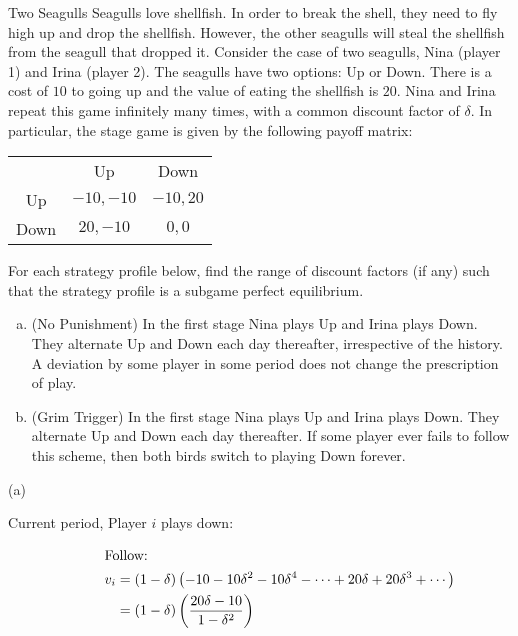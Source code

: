 \documentclass[8pt]{extarticle}
\begin{document}
  \begin{problem}{Two Seagulls}
    Seagulls love shellfish. In order to break the shell, they need to fly high up and drop the shellfish. However, the other seagulls will steal the shellfish from the seagull that dropped it. Consider the case of two seagulls, Nina (player 1) and Irina (player 2). The seagulls have two options: Up or Down. There is a cost of $10$ to going up and the value of eating the shellfish is $20$. Nina and Irina repeat this game infinitely many times, with a common discount factor of $\delta$. In particular, the stage game is given by the following payoff matrix:
    \begin{center}
      \begin{tabular}{c|c|c|}
        \multicolumn{1}{c}{} & \multicolumn{1}{c}{Up} & \multicolumn{1}{c}{Down}\\
        \cline{2-3}
        Up & $-10,-10$ & $-10,20$\\
        \cline{2-3}
        Down & $20,-10$ & $0,0$\\
        \cline{2-3}
      \end{tabular}
    \end{center}
    For each strategy profile below, find the range of discount factors (if any) such that the strategy profile is a subgame perfect equilibrium.
    \begin{enumerate}[(a)]
      \item (No Punishment) In the first stage Nina plays Up and Irina plays Down. They alternate Up and Down each day thereafter, irrespective of the history. A deviation by some player in some period does not change the prescription of play.
      \item (Grim Trigger) In the first stage Nina plays Up and Irina plays Down. They alternate Up and Down each day thereafter. If some player ever fails to follow this scheme, then both birds switch to playing Down forever.
    \end{enumerate}
    \tcblower
    \begin{problem}{(a)}
      \begin{description}
        \item[Current period, Player $i$ plays down:]\hfill
          \begin{align*}
            \shortintertext{Follow:}
            v_i &= (1-\delta)\left(-10 - 10\delta^2 - 10\delta^4 - \cdots + 20\delta + 20\delta^3 + \cdots\right)\\
                &= (1-\delta)\left(\frac{20\delta-10}{1-\delta^2}\right)\\

\end{align*}
\end{description}
\end{problem}
\end{problem}
\end{document}
